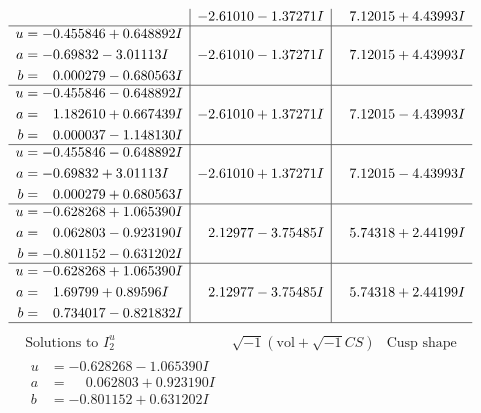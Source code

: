 \documentclass[1p]{elsarticle_modified}
\theoremstyle{definition}
\newcommand{\I}{\sqrt{-1}}
\begin{document}
$$\begin{array}{c|c|c}
 & -2.61010 - 1.37271 I & \phantom{-}7.12015 + 4.43993 I \\ \hline\begin{aligned}
u &= -0.455846 + 0.648892 I \\
a &= -0.69832 - 3.01113 I \\
b &= \phantom{-}0.000279 - 0.680563 I\end{aligned}
 & -2.61010 - 1.37271 I & \phantom{-}7.12015 + 4.43993 I \\ \hline\begin{aligned}
u &= -0.455846 - 0.648892 I \\
a &= \phantom{-}1.182610 + 0.667439 I \\
b &= \phantom{-}0.000037 - 1.148130 I\end{aligned}
 & -2.61010 + 1.37271 I & \phantom{-}7.12015 - 4.43993 I \\ \hline\begin{aligned}
u &= -0.455846 - 0.648892 I \\
a &= -0.69832 + 3.01113 I \\
b &= \phantom{-}0.000279 + 0.680563 I\end{aligned}
 & -2.61010 + 1.37271 I & \phantom{-}7.12015 - 4.43993 I \\ \hline\begin{aligned}
u &= -0.628268 + 1.065390 I \\
a &= \phantom{-}0.062803 - 0.923190 I \\
b &= -0.801152 - 0.631202 I\end{aligned}
 & \phantom{-}2.12977 - 3.75485 I & \phantom{-}5.74318 + 2.44199 I \\ \hline\begin{aligned}
u &= -0.628268 + 1.065390 I \\
a &= \phantom{-}1.69799 + 0.89596 I \\
b &= \phantom{-}0.734017 - 0.821832 I\end{aligned}
 & \phantom{-}2.12977 - 3.75485 I & \phantom{-}5.74318 + 2.44199 I\\
 \hline 
 \end{array}$$\newpage$$\begin{array}{c|c|c}  
\text{Solutions to }I^u_{2}& \I (\text{vol} + \sqrt{-1}CS) & \text{Cusp shape}\\
 \hline 
\begin{aligned}
u &= -0.628268 - 1.065390 I \\
a &= \phantom{-}0.062803 + 0.923190 I \\
b &= -0.801152 + 0.631202 I\end{aligned}

\end{array}$$
\end{document}
